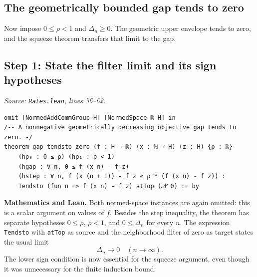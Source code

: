\documentclass[11pt,a4paper]{article}
\newcommand{\lean}[1]{\ifmmode\text{\nolinkurl{#1}}\else\nolinkurl{#1}\fi}
\newenvironment{proofstep}{%
 \begin{lrbox}{\proofstepbox}\begin{minipage}{\linewidth}%
}{%
 \end{minipage}\end{lrbox}%
 \par\Needspace{\dimexpr\ht\proofstepbox+\dp\proofstepbox+8pt\relax}%
 \noindent\usebox{\proofstepbox}\par\medskip%
}
\begin{document}
\begin{proofstep}

\section{The geometrically bounded gap tends to zero}

Now impose $0\le\rho<1$ and $\Delta_n\ge0$. The geometric upper envelope tends to zero, and the squeeze theorem transfers that limit to the gap.

\subsection*{Step 1: State the filter limit and its sign hypotheses}

\textit{Source: \lean{Rates.lean}, lines 56--62.}
\begin{lstlisting}[style=leanproof,firstnumber=56]
omit [NormedAddCommGroup H] [NormedSpace ℝ H] in
/-- A nonnegative geometrically decreasing objective gap tends to zero. -/
theorem gap_tendsto_zero (f : H → ℝ) (x : ℕ → H) (z : H) {ρ : ℝ}
    (hρ₀ : 0 ≤ ρ) (hρ₁ : ρ < 1)
    (hgap : ∀ n, 0 ≤ f (x n) - f z)
    (hstep : ∀ n, f (x (n + 1)) - f z ≤ ρ * (f (x n) - f z)) :
    Tendsto (fun n => f (x n) - f z) atTop (𝓝 0) := by
\end{lstlisting}


\textbf{Mathematics and Lean.} Both normed-space instances are again omitted: this is a scalar argument on values of $f$. Besides the step inequality, the theorem has separate hypotheses $0\le\rho$, $\rho<1$, and $0\le\Delta_n$ for every $n$. The expression \lean{Tendsto} with \lean{atTop} as source and the neighborhood filter of zero as target states the usual limit
\[
\Delta_n\longrightarrow0\quad(n\to\infty).
\]
The lower sign condition is now essential for the squeeze argument, even though it was unnecessary for the finite induction bound.

\end{proofstep}
\end{document}
